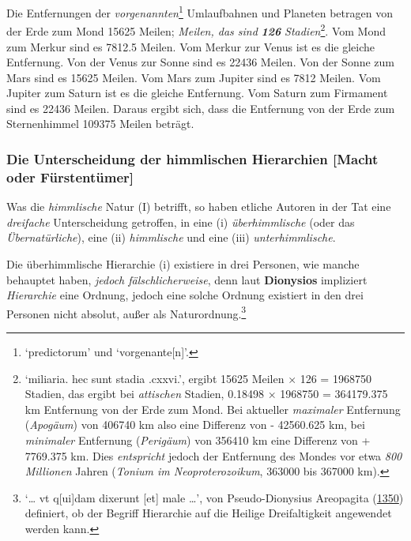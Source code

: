 \documentclass[
]{article}
\begin{document}
Die Entfernungen der \emph{vorgenannten}\footnote{`predictorum' und
  `vorgenante{[}n{]}'.} Umlaufbahnen und Planeten betragen von der Erde
zum Mond 15625 Meilen; \emph{Meilen, das sind} \textbf{\emph{126}}
\emph{Stadien}\footnote{`miliaria. hec sunt stadia .cxxvi.', ergibt
  15625 Meilen × 126 = 1968750 Stadien, das ergibt bei \emph{attischen}
  Stadien, 0.18498 × 1968750 = 364179.375 km Entfernung von der Erde zum
  Mond. Bei aktueller \emph{maximaler} Entfernung (\emph{Apogäum}) von
  406740 km also eine Differenz von - 42560.625 km, bei \emph{minimaler}
  Entfernung (\emph{Perigäum}) von 356410 km eine Differenz von +
  7769.375 km. Dies \emph{entspricht} jedoch der Entfernung des Mondes vor etwa
  \emph{800 Millionen} Jahren (\emph{Tonium im Neoproterozoikum}, 363000
  bis 367000 km).}. Vom Mond zum Merkur sind es 7812.5 Meilen. Vom
Merkur zur Venus ist es die gleiche Entfernung. Von der Venus zur Sonne
sind es 22436 Meilen. Von der Sonne zum Mars sind es 15625 Meilen. Vom
Mars zum Jupiter sind es 7812 Meilen. Vom Jupiter zum Saturn ist es die
gleiche Entfernung. Vom Saturn zum Firmament sind es 22436 Meilen.
Daraus ergibt sich, dass die Entfernung von der Erde zum Sternenhimmel
109375 Meilen beträgt.

\hypertarget{die-unterscheidung-der-himmlischen-hierarchien-macht-oder-fuxfcrstentuxfcmer}{%
\subsubsection{Die Unterscheidung der himmlischen Hierarchien {[}Macht
oder
Fürstentümer{]}}\label{die-unterscheidung-der-himmlischen-hierarchien-macht-oder-fuxfcrstentuxfcmer}}

Was die \emph{himmlische} Natur (I) betrifft, so haben etliche Autoren
in der Tat eine \emph{dreifache} Unterscheidung getroffen, in eine (i)
\emph{überhimmlische} (oder das \emph{Übernatürliche}), eine (ii)
\emph{himmlische} und eine (iii) \emph{unterhimmlische}.

Die überhimmlische Hierarchie (i) existiere in drei Personen, wie manche
behauptet haben, \emph{jedoch fälschlicherweise}, denn laut
\textbf{Dionysios} impliziert \emph{Hierarchie} eine Ordnung, jedoch
eine solche Ordnung existiert in den drei Personen nicht absolut, außer
als Naturordnung.\footnote{`\ldots{} vt q{[}ui{]}dam dixerunt {[}et{]}
  male \ldots{}', von Pseudo-Dionysius Areopagita
  (\href{https://digital.bodleian.ox.ac.uk/objects/ee19a692-5066-4c84-95db-d93c4fc82b97/}{1350})
  definiert, ob der Begriff Hierarchie auf die Heilige Dreifaltigkeit
  angewendet werden kann.}
\end{document}
